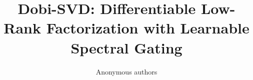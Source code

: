 \title{\textbf{Dobi-SVD: Differentiable Low-Rank Factorization with Learnable Spectral Gating}}

\author{Anonymous authors}

